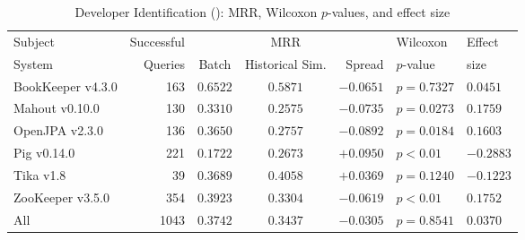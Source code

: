 \begin{table}[t]
\centering
\caption{Developer Identification (\dtwo): MRR, Wilcoxon $p$-values, and effect size}
\begin{tabular}{l|r|ccr|ll}
\toprule
Subject & Successful &    & MRR &        & Wilcoxon  & Effect \\
System  & Queries    & Batch & Historical Sim.  & Spread & $p$-value & size \\
\midrule
BookKeeper v4.3.0 & 163 & $\bm{0.6522}$ & $0.5871$ & $-0.0651$ & $p = 0.7327$ & $0.0451$ \\
Mahout v0.10.0 & 130 & $\bm{0.3310}$ & $0.2575$ & $-0.0735$ & $p = 0.0273$ & $0.1759$ \\
OpenJPA v2.3.0 & 136 & $\bm{0.3650}$ & $0.2757$ & $-0.0892$ & $p = 0.0184$ & $0.1603$ \\
Pig v0.14.0 & 221 & $0.1722$ & $\bm{0.2673}$ & $+0.0950$ & $p < 0.01$ & $-0.2883$ \\
Tika v1.8 & 39 & $0.3689$ & $\bm{0.4058}$ & $+0.0369$ & $p = 0.1240$ & $-0.1223$ \\
ZooKeeper v3.5.0 & 354 & $\bm{0.3923}$ & $0.3304$ & $-0.0619$ & $p < 0.01$ & $0.1752$ \\
\midrule
All & 1043 & $\bm{0.3742}$ & $0.3437$ & $-0.0305$ & $p = 0.8541$ & $0.0370$ \\
\bottomrule
\end{tabular}
\label{table:triage_rq2}
\end{table}

